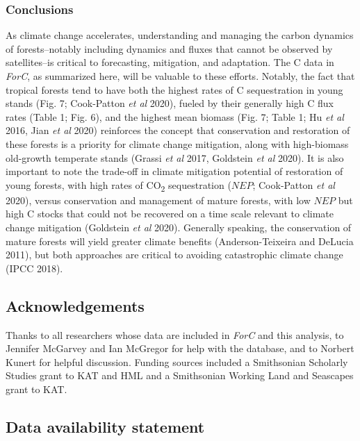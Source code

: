 \documentclass[
]{article}
\begin{document}
\hypertarget{conclusions}{%
\subsubsection{Conclusions}\label{conclusions}}

As climate change accelerates, understanding and managing the carbon
dynamics of forests--notably including dynamics and fluxes that cannot
be observed by satellites--is critical to forecasting, mitigation, and
adaptation. The C data in \emph{ForC}, as summarized here, will be
valuable to these efforts. Notably, the fact that tropical forests tend
to have both the highest rates of C sequestration in young stands (Fig.
7; Cook-Patton \emph{et al} 2020), fueled by their generally high C flux
rates (Table 1; Fig. 6), and the highest mean biomass (Fig. 7; Table 1;
Hu \emph{et al} 2016, Jian \emph{et al} 2020) reinforces the concept
that conservation and restoration of these forests is a priority for
climate change mitigation, along with high-biomass old-growth temperate
stands (Grassi \emph{et al} 2017, Goldstein \emph{et al} 2020). It is
also important to note the trade-off in climate mitigation potential of
restoration of young forests, with high rates of CO\textsubscript{2}
sequestration (\(NEP\); Cook-Patton \emph{et al} 2020), versus
conservation and management of mature forests, with low \(NEP\) but high
C stocks that could not be recovered on a time scale relevant to climate
change mitigation (Goldstein \emph{et al} 2020). Generally speaking, the
conservation of mature forests will yield greater climate benefits
(Anderson-Teixeira and DeLucia 2011), but both approaches are critical
to avoiding catastrophic climate change (IPCC 2018).

\hypertarget{acknowledgements}{%
\subsection{Acknowledgements}\label{acknowledgements}}

Thanks to all researchers whose data are included in \emph{ForC} and
this analysis, to Jennifer McGarvey and Ian McGregor for help with the
database, and to Norbert Kunert for helpful discussion. Funding sources
included a Smithsonian Scholarly Studies grant to KAT and HML and a
Smithsonian Working Land and Seascapes grant to KAT.

\hypertarget{data-availability-statement}{%
\subsection{Data availability
statement}\label{data-availability-statement}}
\end{document}
